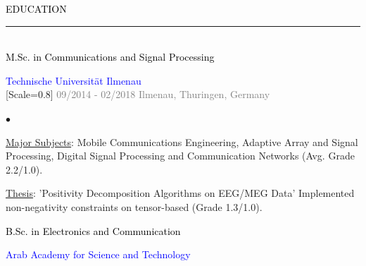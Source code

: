 {\setmainfont{Rubik Medium}\fontsize{11}{14}\selectfont\textcolor{black}{EDUCATION}}
\\[-4pt]
\textcolor{black}{\rule{\textwidth}{2pt}}\\[-4pt]

{\setmainfont{Rubik Medium}\fontsize{10}{14}\selectfont\textcolor{black}{M.Sc. in Communications and Signal Processing}}

{\setmainfont{Rubik Medium}\fontsize{10}{14}\selectfont\textcolor{blue}{Technische Universität Ilmenau}}\\[-6pt]

{[Scale=0.8]
\textcolor{gray}{
\faCalendar\hspace{4pt}09/2014 - 02/2018\hspace{1.5em}
\faMapMarker*\hspace{4pt}Ilmenau, Thuringen, Germany
}}\\[-15pt]

{\setmainfont{Rubik Light}\fontsize{10}{13}\selectfont
\color{gray}
\begin{list}{$\bullet$}{
  \setlength{\topsep}{2pt}        %
  \setlength{\itemsep}{2pt}       %
  \setlength{\parsep}{0pt}
  \setlength{\parskip}{0pt}
  \setlength{\leftmargin}{12pt}   %
  \setlength{\labelsep}{4pt}      %
}
  \item \underline{Major Subjects}: Mobile Communications Engineering, Adaptive Array 
and Signal Processing, Digital Signal Processing and Communication Networks (Avg. Grade 2.2/1.0). 
  \item \underline{Thesis}: 'Positivity Decomposition Algorithms on EEG/MEG Data' Implemented non-negativity constraints on tensor-based (Grade 1.3/1.0).
\end{list}
}

\vspace{0.7em}

{\setmainfont{Rubik Medium}\fontsize{10}{14}\selectfont\textcolor{black}{B.Sc. in Electronics and Communication}}

{\setmainfont{Rubik Medium}\fontsize{10}{14}\selectfont\textcolor{blue}{Arab Academy for Science and Technology}}\\[-6pt]

